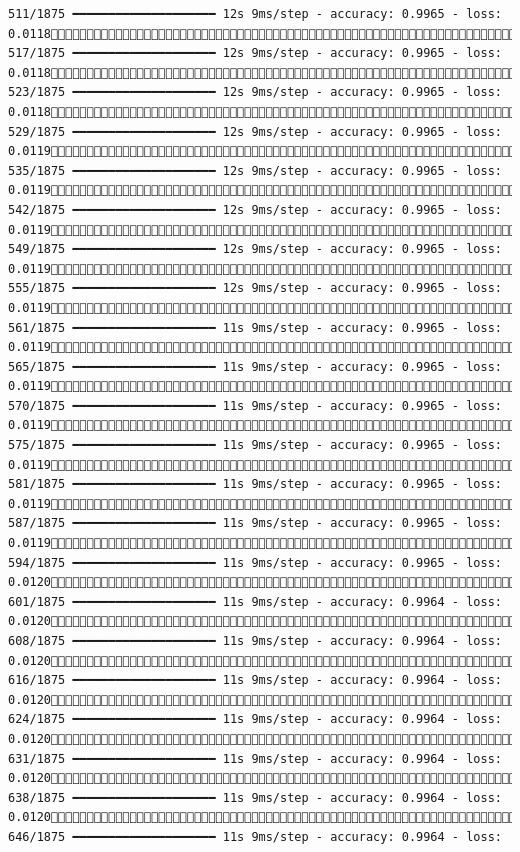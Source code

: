 \documentclass[
  letterpaper,
  DIV=11,
  numbers=noendperiod]{scrreprt}
\begin{document}
\begin{verbatim}
511/1875 ━━━━━━━━━━━━━━━━━━━━ 12s 9ms/step - accuracy: 0.9965 - loss: 0.0118 517/1875 ━━━━━━━━━━━━━━━━━━━━ 12s 9ms/step - accuracy: 0.9965 - loss: 0.0118 523/1875 ━━━━━━━━━━━━━━━━━━━━ 12s 9ms/step - accuracy: 0.9965 - loss: 0.0118 529/1875 ━━━━━━━━━━━━━━━━━━━━ 12s 9ms/step - accuracy: 0.9965 - loss: 0.0119 535/1875 ━━━━━━━━━━━━━━━━━━━━ 12s 9ms/step - accuracy: 0.9965 - loss: 0.0119 542/1875 ━━━━━━━━━━━━━━━━━━━━ 12s 9ms/step - accuracy: 0.9965 - loss: 0.0119 549/1875 ━━━━━━━━━━━━━━━━━━━━ 12s 9ms/step - accuracy: 0.9965 - loss: 0.0119 555/1875 ━━━━━━━━━━━━━━━━━━━━ 12s 9ms/step - accuracy: 0.9965 - loss: 0.0119 561/1875 ━━━━━━━━━━━━━━━━━━━━ 11s 9ms/step - accuracy: 0.9965 - loss: 0.0119 565/1875 ━━━━━━━━━━━━━━━━━━━━ 11s 9ms/step - accuracy: 0.9965 - loss: 0.0119 570/1875 ━━━━━━━━━━━━━━━━━━━━ 11s 9ms/step - accuracy: 0.9965 - loss: 0.0119 575/1875 ━━━━━━━━━━━━━━━━━━━━ 11s 9ms/step - accuracy: 0.9965 - loss: 0.0119 581/1875 ━━━━━━━━━━━━━━━━━━━━ 11s 9ms/step - accuracy: 0.9965 - loss: 0.0119 587/1875 ━━━━━━━━━━━━━━━━━━━━ 11s 9ms/step - accuracy: 0.9965 - loss: 0.0119 594/1875 ━━━━━━━━━━━━━━━━━━━━ 11s 9ms/step - accuracy: 0.9965 - loss: 0.0120 601/1875 ━━━━━━━━━━━━━━━━━━━━ 11s 9ms/step - accuracy: 0.9964 - loss: 0.0120 608/1875 ━━━━━━━━━━━━━━━━━━━━ 11s 9ms/step - accuracy: 0.9964 - loss: 0.0120 616/1875 ━━━━━━━━━━━━━━━━━━━━ 11s 9ms/step - accuracy: 0.9964 - loss: 0.0120 624/1875 ━━━━━━━━━━━━━━━━━━━━ 11s 9ms/step - accuracy: 0.9964 - loss: 0.0120 631/1875 ━━━━━━━━━━━━━━━━━━━━ 11s 9ms/step - accuracy: 0.9964 - loss: 0.0120 638/1875 ━━━━━━━━━━━━━━━━━━━━ 11s 9ms/step - accuracy: 0.9964 - loss: 0.0120 646/1875 ━━━━━━━━━━━━━━━━━━━━ 11s 9ms/step - accuracy: 0.9964 - loss: 
\end{verbatim}
\end{document}
